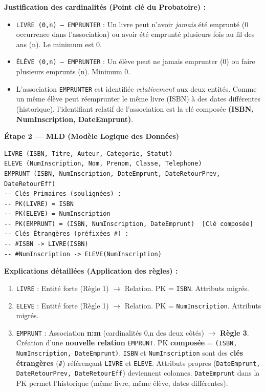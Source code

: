 \documentclass[11pt]{article}
\begin{document}
\begin{exoresolu}
\textbf{Justification des cardinalités (Point clé du Probatoire) :}
\begin{itemize}
    \item \texttt{LIVRE (0,n) — EMPRUNTER} : Un livre peut n'avoir \emph{jamais} été emprunté (0 occurrence dans l'association) ou avoir été emprunté plusieurs fois au fil des ans (n). Le minimum est 0.
    \item \texttt{ÉLÈVE (0,n) — EMPRUNTER} : Un élève peut ne jamais emprunter (0) ou faire plusieurs emprunts (n). Minimum 0.
    \item L'association \texttt{EMPRUNTER} est identifiée \emph{relativement} aux deux entités. Comme un même élève peut réemprunter le même livre (ISBN) à des dates différentes (historique), l'identifiant relatif de l'association est la clé composée \textbf{(ISBN, NumInscription, DateEmprunt)}.
\end{itemize}

\textbf{Étape 2 — MLD (Modèle Logique des Données)}

\begin{propriete}
\begin{lstlisting}
LIVRE (ISBN, Titre, Auteur, Categorie, Statut)
ELEVE (NumInscription, Nom, Prenom, Classe, Telephone)
EMPRUNT (ISBN, NumInscription, DateEmprunt, DateRetourPrev, DateRetourEff)
-- Clés Primaires (soulignées) :
-- PK(LIVRE) = ISBN
-- PK(ELEVE) = NumInscription
-- PK(EMPRUNT) = (ISBN, NumInscription, DateEmprunt)  [Clé composée]
-- Clés Étrangères (préfixées #) :
-- #ISBN -> LIVRE(ISBN)
-- #NumInscription -> ELEVE(NumInscription)
\end{lstlisting}
\end{propriete}

\textbf{Explications détaillées (Application des règles) :}
\begin{enumerate}
    \item \texttt{LIVRE} : Entité forte (Règle 1) $\rightarrow$ Relation. PK = \texttt{ISBN}. Attributs migrés.
    \item \texttt{ELEVE} : Entité forte (Règle 1) $\rightarrow$ Relation. PK = \texttt{NumInscription}. Attributs migrés.
    \item \texttt{EMPRUNT} : Association \textbf{n:m} (cardinalités 0,n des deux côtés) $\rightarrow$ \textbf{Règle 3}. Création d'une \textbf{nouvelle relation} \texttt{EMPRUNT}. PK \textbf{composée} = \texttt{(ISBN, NumInscription, DateEmprunt)}. \texttt{ISBN} et \texttt{NumInscription} sont des \textbf{clés étrangères} (\texttt{\#}) référençant \texttt{LIVRE} et \texttt{ELEVE}. Attributs propres (\texttt{DateEmprunt, DateRetourPrev, DateRetourEff}) deviennent colonnes. \texttt{DateEmprunt} dans la PK permet l'historique (même livre, même élève, dates différentes).
\end{enumerate}


\end{exoresolu}
\end{document}
